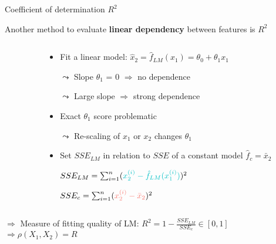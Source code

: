\documentclass[10pt,compress,t,notes=noshow, xcolor=table]{beamer}
\begin{document}
\begin{frame}{Coefficient of determination $R^2$}

Another method to evaluate \textbf{linear dependency} between features is $R^2$

\begin{columns}[c, totalwidth=\textwidth]
\begin{column}{0.48\linewidth}
\end{column}
\begin{column}{0.52\linewidth}

\medskip

\begin{itemize}
    \setlength\itemsep{0.7mm}
    \item Fit a linear model:
    $\hat{x}_2 = \hat{f}_{LM}(x_1) = \theta_0 + \theta_1 x_1$
    \item[$\leadsto$] Slope $\theta_1$ = $0$ $\Rightarrow$ no dependence
    \item[$\leadsto$] Large slope $\Rightarrow$ strong dependence
        \pause
    \item Exact $\theta_1$ score problematic 
    \item[$\leadsto$] Re-scaling of $x_1$ or $x_2$ changes $\theta_1$ 
    \pause
    \item Set $SSE_{LM}$ in relation to $SSE$ of a constant model $\hat{f}_c = \bar{x}_2$
    \item[] $SSE_{LM} = \sum_{i=1}^n ({\color{ggblue}x_2^{(i)} - \hat{f}_{LM}(x_1^{(i)})})^2$
    \item[] $SSE_{c} = \sum_{i=1}^n ({\color{ggred}x_2^{(i)} - \bar{x}_2})^2$
\end{itemize}

\end{column}
\end{columns}

\medskip

$\Rightarrow$ Measure of fitting quality of LM: $R^2 = 1-\frac{SSE_{LM}}{SSE_{c}} \in [0, 1]$ \\
$\Rightarrow \rho(X_1, X_2) = R$

\end{frame}
\end{document}
